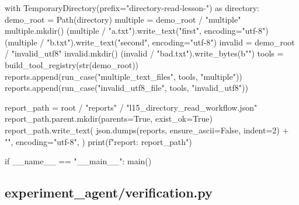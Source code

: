 \begin{Code}
    with TemporaryDirectory(prefix="directory-read-lesson-") as directory:
        demo_root = Path(directory)
        multiple = demo_root / "multiple"
        multiple.mkdir()
        (multiple / "a.txt").write_text("first", encoding="utf-8")
        (multiple / "b.txt").write_text("second", encoding="utf-8")
        invalid = demo_root / "invalid_utf8"
        invalid.mkdir()
        (invalid / "bad.txt").write_bytes(b"\xff\xfe")
        tools = build_tool_registry(str(demo_root))
        reports.append(run_case("multiple_text_files", tools, "multiple"))
        reports.append(run_case("invalid_utf8_file", tools, "invalid_utf8"))

    report_path = root / "reports" / "l15_directory_read_workflow.json"
    report_path.parent.mkdir(parents=True, exist_ok=True)
    report_path.write_text(
        json.dumps(reports, ensure_ascii=False, indent=2) + "\n", encoding="utf-8",
    )
    print(f"\nSaved report: {report_path}")


if __name__ == "__main__":
    main()
\end{Code}

\subsection{experiment\_agent/verification.py}

